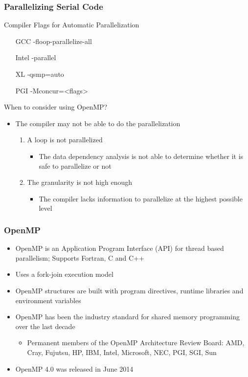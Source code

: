 \documentclass[10pt,t]{beamer}
\begin{document}
\begin{frame}
  \frametitle{Parallelizing Serial Code}
  \begin{exampleblock}{Compiler Flags for Automatic Parallelization}
    \begin{itemize}
      \item[GCC] -floop-parallelize-all
      \item[Intel] -parallel
      \item[XL] -qsmp=auto
      \item[PGI] -Mconcur=<flags>
    \end{itemize}
  \end{exampleblock}
  \begin{block}{When to consider using OpenMP?}
    \begin{itemize}
      \item The compiler may not be able to do the parallelization
      \begin{enumerate}
        \item A loop is not parallelized
        \begin{itemize}
          \item The data dependency analysis is not able to determine whether it is safe to parallelize or not
        \end{itemize}
        \item The granularity is not high enough
        \begin{itemize}
          \item The compiler lacks information to parallelize at the highest possible level
        \end{itemize}
      \end{enumerate}
    \end{itemize}
  \end{block}
\end{frame}

\begin{frame}
  \frametitle{OpenMP}
  \begin{block}{}
    \begin{itemize}
      \item OpenMP is an Application Program Interface (API) for thread based parallelism; Supports Fortran, C and C++
      \item Uses a fork-join execution model
      \item OpenMP structures are built with program directives, runtime libraries and environment variables
      \item OpenMP has been the industry standard for shared memory programming over the last decade
      \begin{itemize}
        \item Permanent members of the OpenMP Architecture Review Board: AMD, Cray, Fujutsu, HP, IBM, Intel, Microsoft, NEC, PGI, SGI, Sun
      \end{itemize}
      \item OpenMP 4.0 was released in June 2014
    \end{itemize}
  \end{block}
\end{frame}
\end{document}
